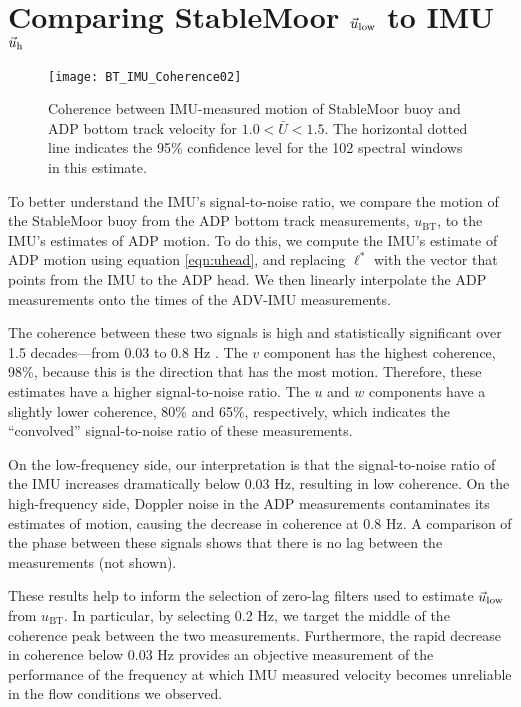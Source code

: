 \section{Comparing StableMoor $\vec{u}_\mathrm{low}$ to IMU $\vec{u}_\mathrm{h}$}
\label{apdx:ulow}

\def\ubt{\ensuremath{u_\mathrm{BT}}}

\begin{figure}[t]
  \centering
  \texttt{[image: BT\_IMU\_Coherence02]}
  \caption{Coherence between IMU-measured motion of StableMoor buoy and ADP bottom track velocity for $1.0<\bar{U}<1.5$. The horizontal dotted line indicates the 95\% confidence level for the 102 spectral windows in this estimate.}
  \label{fig:SM_coh}
\end{figure}
To better understand the IMU's signal-to-noise ratio, we compare the motion of the StableMoor buoy from the ADP bottom track measurements, $\ubt$, to the IMU's estimates of ADP motion. To do this, we compute the IMU's estimate of ADP motion using equation \eqref{eqn:uhead}, and replacing $\ell^{*}$ with the vector that points from the IMU to the ADP head. We then linearly interpolate the ADP measurements onto the times of the ADV-IMU measurements.

The coherence between these two signals is high and statistically significant over 1.5 decades---from 0.03 to 0.8 Hz \cite[][]{Priestley1981}. The $v$ component has the highest coherence, 98\%, because this is the direction that has the most motion. Therefore, these estimates have a higher signal-to-noise ratio.  The $u$ and $w$ components have a slightly lower coherence, 80\% and 65\%, respectively, which indicates the ``convolved'' signal-to-noise ratio of these measurements.

On the low-frequency side, our interpretation is that the signal-to-noise ratio of the IMU increases dramatically below 0.03 Hz, resulting in low coherence. On the high-frequency side, Doppler noise in the ADP measurements contaminates its estimates of motion, causing the decrease in coherence at 0.8 Hz. A comparison of the phase between these signals shows that there is no lag between the measurements (not shown).


These results help to inform the selection of zero-lag filters used to estimate $\vec{u}_\mathrm{low}$ from $\ubt$. In particular, by selecting 0.2 Hz, we target the middle of the coherence peak between the two measurements. Furthermore, the rapid decrease in coherence below 0.03 Hz provides an objective measurement of the performance of the frequency at which IMU measured velocity becomes unreliable in the flow conditions we observed. 



